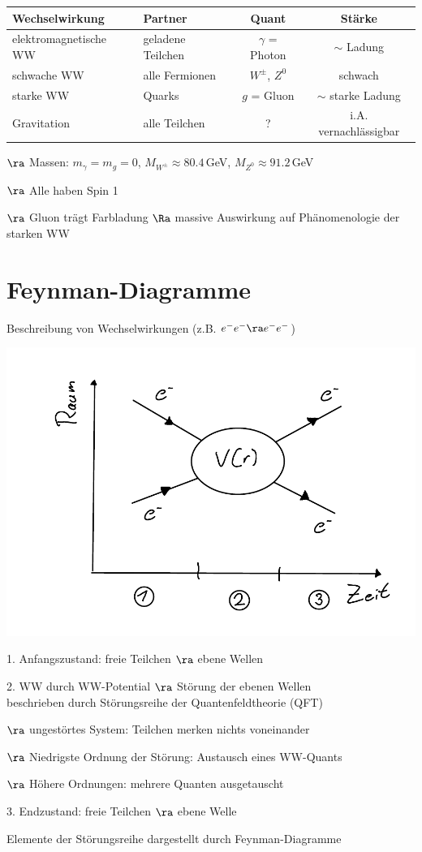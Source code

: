 \begin{center}
\begin{tabular}{l | l | c | c}
Wechselwirkung & Partner & Quant & Stärke \\
\hline
elektromagnetische WW & geladene Teilchen & $\gamma$ =  Photon & $\sim$ Ladung\\
schwache WW & alle Fermionen & $W^\pm$, $Z^0$ & schwach\\
starke WW & Quarks & $g$ = Gluon & $\sim$ starke Ladung \\
Gravitation & alle Teilchen & ? & i.A. vernachlässigbar
\end{tabular}
\end{center}
\begin{compactitem}
\item[$\ra$] Massen: $m_\gamma = m_g = 0$, $M_{W^\pm} \approx 80.4\,$GeV, $M_{Z^0} \approx 91.2$\,GeV
\item[$\ra$] Alle haben Spin 1
\item[$\ra$] Gluon trägt Farbladung $\Ra$ massive Auswirkung auf Phänomenologie der starken WW
\end{compactitem}
\section{Feynman-Diagramme}
Beschreibung von Wechselwirkungen (z.B. $e^-e^- \ra e^-e^-$)
\begin{center}
\captionsetup{type=figure}
\includegraphics[width=.5\textwidth]{imgs/ep5-fig-2-1.pdf}
\end{center}
\begin{compactitem}
\item[1.] Anfangszustand: \glqq freie\grqq{} Teilchen $\ra$ ebene Wellen
\item[2.] WW durch WW-Potential $\ra$ Störung der ebenen Wellen\\
beschrieben durch Störungsreihe der Quantenfeldtheorie (QFT)
\begin{compactitem}
\item[$\ra$] ungestörtes System: Teilchen \glqq merken nichts voneinander\grqq
\item[$\ra$] Niedrigste Ordnung der Störung: Austausch eines WW-Quants
\item[$\ra$] Höhere Ordnungen: mehrere Quanten ausgetauscht
\end{compactitem}
\item[3.] Endzustand: \glqq freie\grqq{} Teilchen $\ra$ ebene Welle
\end{compactitem}
Elemente der Störungsreihe dargestellt durch Feynman-Diagramme

